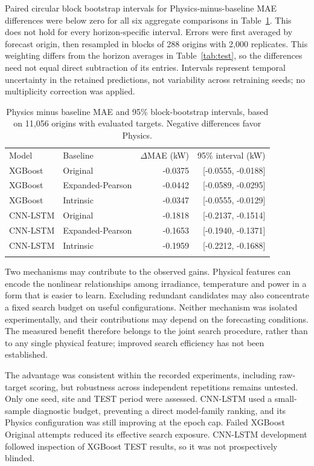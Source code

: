 \documentclass[10pt,a4paper]{article}
\newcommand{\toprule}{\noalign{\hrule height .7pt\vskip3pt}}
\newcommand{\midrule}{\noalign{\vskip2pt\hrule height .4pt\vskip2pt}}
\newcommand{\bottomrule}{\noalign{\vskip3pt\hrule height .7pt}}
\begin{document}
Paired circular block bootstrap intervals for Physics-minus-baseline MAE differences were below zero for all six aggregate comparisons in Table~\ref{tab:ci}. This does not hold for every horizon-specific interval. Errors were first averaged by forecast origin, then resampled in blocks of 288 origins with 2,000 replicates. This weighting differs from the horizon averages in Table~\ref{tab:test}, so the differences need not equal direct subtraction of its entries. Intervals represent temporal uncertainty in the retained predictions, not variability across retraining seeds; no multiplicity correction was applied.

\begin{table}[htbp]
\centering\small
\begin{tabular}{@{}llrr@{}}\toprule
Model & Baseline & $\Delta$MAE (kW) & 95\% interval (kW) \\\midrule
XGBoost & Original & -0.0375 & [-0.0555, -0.0188] \\
XGBoost & Expanded-Pearson & -0.0442 & [-0.0589, -0.0295] \\
XGBoost & Intrinsic & -0.0347 & [-0.0555, -0.0129] \\
\midrule
CNN-LSTM & Original & -0.1818 & [-0.2137, -0.1514] \\
CNN-LSTM & Expanded-Pearson & -0.1653 & [-0.1940, -0.1371] \\
CNN-LSTM & Intrinsic & -0.1959 & [-0.2212, -0.1688] \\
\bottomrule\end{tabular}
\caption{Physics minus baseline MAE and 95\% block-bootstrap intervals, based on 11,056 origins with evaluated targets. Negative differences favor Physics.}\label{tab:ci}
\end{table}

Two mechanisms may contribute to the observed gains. Physical features can encode the nonlinear relationships among irradiance, temperature and power in a form that is easier to learn. Excluding redundant candidates may also concentrate a fixed search budget on useful configurations. Neither mechanism was isolated experimentally, and their contributions may depend on the forecasting conditions. The measured benefit therefore belongs to the joint search procedure, rather than to any single physical feature; improved search efficiency has not been established.

The advantage was consistent within the recorded experiments, including raw-target scoring, but robustness across independent repetitions remains untested. Only one seed, site and TEST period were assessed. CNN-LSTM used a small-sample diagnostic budget, preventing a direct model-family ranking, and its Physics configuration was still improving at the epoch cap. Failed XGBoost Original attempts reduced its effective search exposure. CNN-LSTM development followed inspection of XGBoost TEST results, so it was not prospectively blinded.
\end{document}
